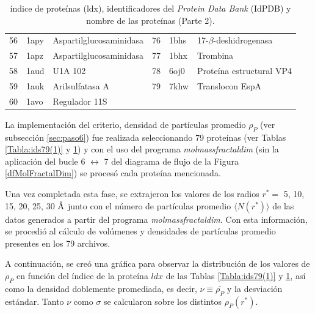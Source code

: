 \begin{table}[H]
\begin{footnotesize}
\begin{tabular}{||l|ll||l|ll||}
 				56  & 1apy  & Aspartilglucosaminidasa              & 76 & 1bhs  & 17-$\beta$-deshidrogenasa        \\
 				57  & 1apz  & Aspartilglucosaminidasa              & 77 & 1bhx  & Trombina                         \\
 				58  & 1aud  & U1A 102                              & 78 & 6oj0  & Prote\'{i}na estructural VP4         \\
 				59  & 1auk  & Arilsulfatasa A                      & 79 & 7khw  & Translocon EspA                  \\
 				60  & 1avo  & Regulador 11S                        &    &       &  \\ \hline
 			\end{tabular}
 		\end{footnotesize}
 		\caption{\'{i}ndice de prote\'{i}nas (ldx), identificadores del \emph{Protein Data Bank} (IdPDB) y nombre de las prote\'{i}nas (Parte 2).}
 		\label{Tabla:ids79(2)}
 	\end{table}
 
 	
 	La implementaci\'{o}n del criterio, densidad de part\'{i}culas 
 	promedio $\rho_{P}$ (ver subsecci\'{o}n \ref{sec:paso6}) 
 	fue realizada seleccionando 79 prote\'{i}nas 
 	(ver Tablas \ref{Tabla:ids79(1)} y \ref{Tabla:ids79(2)}) 
 	y con el uso del programa \emph{molmassfractaldim} 
 	(sin la aplicaci\'{o}n del bucle 6 $\longleftrightarrow$ 7 
 	del diagrama de flujo de la Figura \ref{dfMolFractalDim}) 
 	se proces\'{o} cada prote\'{i}na mencionada. 
 
 	Una vez completada esta fase, se extrajeron los valores 
 	de los radios $r^*{=}$ 5, 10, 15, 20, 25, 30 $\textup{\r{A}}$
 	 junto con el n\'{u}mero de part\'{i}culas promedio $\langle N(r^{*}) \rangle$ 
 	  de las datos generados a partir del programa \emph{molmassfractaldim}.
 	   Con esta informaci\'{o}n, se procedi\'{o} al c\'{a}lculo de vol\'{u}menes y densidades 
 	   de part\'{i}culas promedio presentes en los 79 archivos. 
 	
 	
 	A continuaci\'{o}n, se cre\'{o} una gr\'{a}fica para observar la distribuci\'{o}n 
 	de los valores de $\rho_{P}$ en funci\'{o}n del \'{i}ndice de la 
 	prote\'{i}na $ldx$ de las Tablas \ref{Tabla:ids79(1)} y \ref{Tabla:ids79(2)},
 	 as\'{i} como la densidad doblemente promediada, es decir, $\nu\equiv\bar{\rho_P}$ 
 	 y la desviaci\'{o}n est\'{a}ndar. Tanto $\nu$ como $\sigma$ se calcularon
 	  sobre los distintos $\rho_P(r^*)$.
 	
